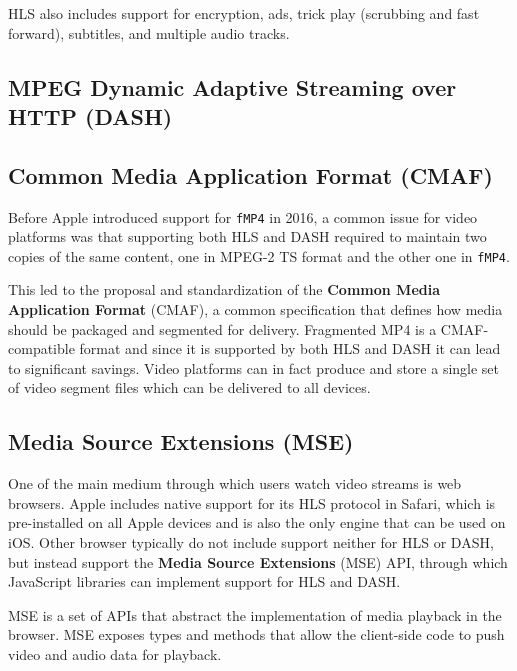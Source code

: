HLS also includes support for encryption, ads, trick play (scrubbing and fast forward), subtitles, and multiple audio tracks.


\subsection{MPEG Dynamic Adaptive Streaming over HTTP (DASH)}
\label{sec:bg/technologies/dash}


\subsection{Common Media Application Format (CMAF)}
\label{sec:bg/technologies/cmaf}

Before Apple introduced support for \texttt{fMP4} in 2016, a common issue for video platforms was that supporting both HLS and DASH required to maintain two copies of the same content, one in MPEG-2 TS format and the other one in \texttt{fMP4}.

This led to the proposal and standardization of the \textbf{Common Media Application Format} (CMAF), a common specification that defines how media should be packaged and segmented for delivery. Fragmented MP4 is a CMAF-compatible format and since it is supported by both HLS and DASH it can lead to significant savings. Video platforms can in fact produce and store a single set of video segment files which can be delivered to all devices.\cite{cmaf}

\subsection{Media Source Extensions (MSE)}
\label{sec:bg/technologies/mse}

One of the main medium through which users watch video streams is web browsers. Apple includes native support for its HLS protocol in Safari, which is pre-installed on all Apple devices and is also the only engine that can be used on iOS. Other browser typically do not include support neither for HLS or DASH, but instead support the \textbf{Media Source Extensions} (MSE) API, through which JavaScript libraries can implement support for HLS and DASH.\cite{mse}

MSE is a set of APIs that abstract the implementation of media playback in the browser. MSE exposes types and methods that allow the client-side code to push video and audio data for playback.

